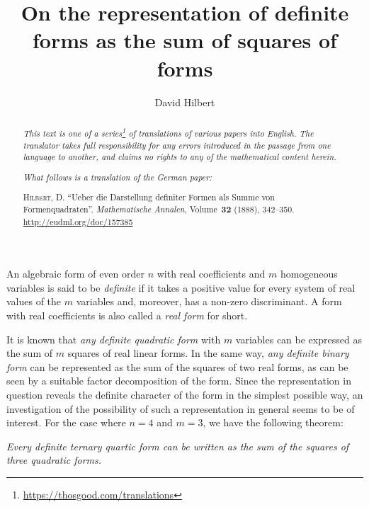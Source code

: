 \documentclass{article}
\title{On the representation of definite forms as the sum of squares of forms}
\author{David Hilbert}
\date{}
\newcommand{\doctype}{German paper}
\newcommand{\origcit}{%
  \textsc{Hilbert, D.}
  ``Ueber die Darstellung definiter Formen als Summe von Formenquadraten''.
  \emph{Mathematische Annalen}, Volume~\textbf{32} (1888), 342--350.
  {\url{http://eudml.org/doc/157385}}%
}
\newcommand{\oldpage}[1]{\marginpar{\footnotesize$\Big\vert$ \textit{p.~#1}}}
\begin{document}
\maketitle
\thispagestyle{fancy}

\renewcommand{\abstractname}{Translator's note.}

\begin{abstract}
  \renewcommand*{\thefootnote}{\fnsymbol{footnote}}
  \emph{This text is one of a series\footnote{\url{https://thosgood.com/translations}} of translations of various papers into English.}
  \emph{The translator takes full responsibility for any errors introduced in the passage from one language to another, and claims no rights to any of the mathematical content herein.}

  \medskip
  
  \emph{What follows is a translation of the \doctype:}

  \medskip\noindent
  \origcit
\end{abstract}

\setcounter{footnote}{0}
\renewcommand{\thefootnote}{\fnsymbol{footnote}}



\oldpage{342}

An algebraic form of even order $n$ with real coefficients and $m$ homogeneous variables is said to be \emph{definite} if it takes a positive value for every system of real values of the $m$ variables and, moreover, has a non-zero discriminant.
A form with real coefficients is also called a \emph{real form} for short.

It is known that \emph{any definite quadratic form} with $m$ variables can be expressed as the sum of $m$ squares of real linear forms.
In the same way, \emph{any definite binary form} can be represented as the sum of the squares of two real forms, as can be seen by a suitable factor decomposition of the form.
Since the representation in question reveals the definite character of the form in the simplest possible way, an investigation of the possibility of such a representation in general seems to be of interest.
For the case where $n=4$ and $m=3$, we have the following theorem:

\emph{Every definite ternary quartic form can be written as the sum of the squares of three quadratic forms.}
\end{document}
